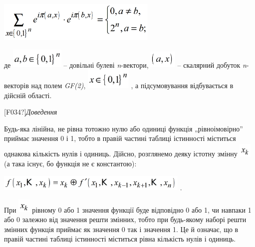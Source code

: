 \documentclass[a4paper]{article}
\newcounter{}
\begin{document}
{\centering 
\includegraphics[width=3in,height=0.75in]{crypt-img/crypt-img131.png} \par}

де  \includegraphics[width=1.0071in,height=0.3827in]{crypt-img/crypt-img132.png}
 – довільні булеві \textit{n}{}-вектори, 
\includegraphics[width=0.5071in,height=0.3354in]{crypt-img/crypt-img133.png}  –
скалярний добуток \textit{n}{}-векторів над полем \textit{GF(2)}, 
\includegraphics[width=0.8508in,height=0.3866in]{crypt-img/crypt-img134.png} ,
а підсумовування відбувається в дійсній області.

\textlatin{[F034?]}\textit{Доведення}

 Будь-яка лінійна, не рівна тотожно  нулю  або одиниці функція „рівноімовірно”
приймає значення 0 і 1, тобто в правій частині таблиці істинності міститься
однакова кількість нулів і одиниць. Дійсно, розглянемо деяку істотну змінну 
\includegraphics[width=0.228in,height=0.2744in]{crypt-img/crypt-img135.png}  (а
така існує, бо функція не є константою):

{\centering
 \includegraphics[width=3.6264in,height=0.3071in]{crypt-img/crypt-img136.png} .
\par}

При 
\includegraphics[width=0.2319in,height=0.2709in]{crypt-img/crypt-img137.png} 
рівному 0 або 1 значення функції буде відповідно  0 або 1, чи навпаки   1 або 0
 залежно від значення решти змінних, тобто при будь-якому наборі решти змінних
функція приймає як  значення  0 так і значення 1. Це й означає, що в правій
частині таблиці істинності міститься рівна кількість нулів і одиниць.
\end{document}
